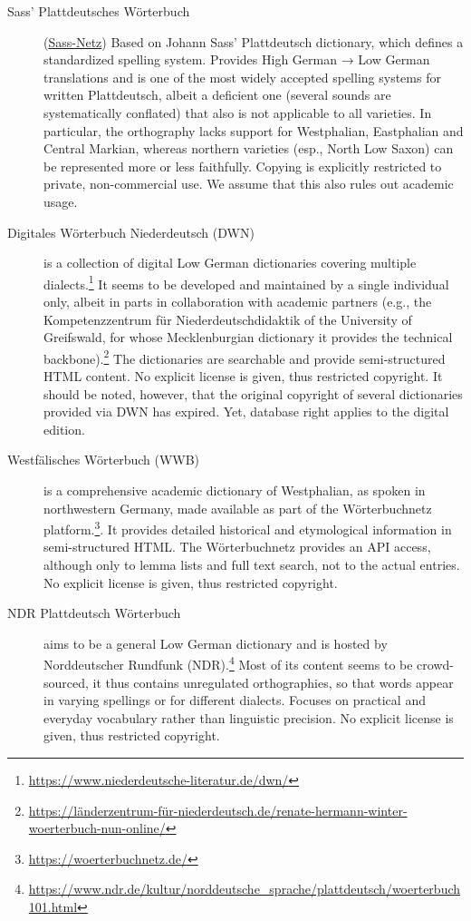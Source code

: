 \documentclass{article}
\begin{document}
\begin{description}
\item[Sass’ Plattdeutsches Wörterbuch] (\href{https://netz.sass-platt.de/hoch-platt}{Sass-Netz})  
    Based on Johann Sass' Plattdeutsch dictionary, which defines a standardized spelling system. Provides High German → Low German translations and is one of the most widely accepted spelling systems for written Plattdeutsch, albeit a deficient one (several sounds are systematically conflated) that also is not applicable to all varieties. In particular, the orthography lacks support for Westphalian, Eastphalian and Central Markian, whereas northern varieties (esp., North Low Saxon) can be represented more or less faithfully. Copying is explicitly restricted to private, non-commercial use. We assume that this also rules out academic usage.

\item[Digitales Wörterbuch Niederdeutsch (DWN)] is a collection of digital Low German dictionaries covering multiple dialects.\footnote{\url{https://www.niederdeutsche-literatur.de/dwn/}} It seems to be developed and maintained by a single individual only, albeit in parts in collaboration with academic partners (e.g., the Kompetenzzentrum für Niederdeutschdidaktik of the University of Greifswald, for whose Mecklenburgian dictionary it provides the technical backbone).\footnote{\url{https://länderzentrum-für-niederdeutsch.de/renate-hermann-winter-woerterbuch-nun-online/}} The dictionaries are searchable and provide semi-structured HTML content. No explicit license is given, thus restricted copyright. It should be noted, however, that the original copyright of several dictionaries provided via DWN has expired. Yet, database right applies to the digital edition. 

\item[Westfälisches Wörterbuch (WWB)] is a comprehensive academic dictionary of Westphalian, as spoken in northwestern Germany, made available as part of the Wörterbuchnetz platform.\footnote{\url{https://woerterbuchnetz.de/}}. It provides detailed historical and etymological information in semi-structured HTML. The Wörterbuchnetz provides an API access, although only to lemma lists and full text search, not to the actual entries. No explicit license is given, thus restricted copyright.

\item[NDR Plattdeutsch Wörterbuch] aims to be a general Low German dictionary and is hosted by Norddeutscher Rundfunk (NDR).\footnote{\url{https://www.ndr.de/kultur/norddeutsche_sprache/plattdeutsch/woerterbuch101.html}} Most of its content seems to be crowd-sourced, it thus contains unregulated orthographies, so that words appear in varying spellings or for different dialects. Focuses on practical and everyday vocabulary rather than linguistic precision. No explicit license is given, thus restricted copyright.


\end{description}
\end{document}
